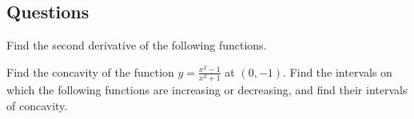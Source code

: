 \subsection*{Questions}
\begin{questions}
  \questioA Find the second derivative of the following functions.
  \questioA Find the concavity of the function $ y = \frac{x^2 - 1}{x^2 + 1} $ at $ (0, -1) $.
  \questioM Find the intervals on which the following functions are increasing or decreasing, and
            find their intervals of concavity.
\end{questions}
